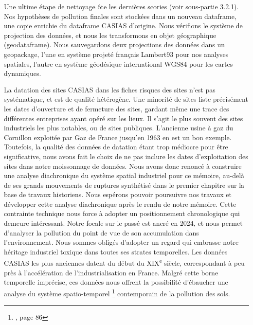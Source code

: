 \documentclass[a4paper,twoside,12pt]{book}
\newcommand{\siecle}[1]{\textsc{#1}\textsuperscript{e} siècle}
\begin{document}
Une ultime étape de nettoyage ôte les dernières scories (voir sous-partie 3.2.1). Nos hypothèses de pollution finales sont stockées dans un nouveau dataframe, une copie enrichie du dataframe CASIAS d'origine. Nous vérifions le système de projection des données, et nous les transformons en objet géographique (geodataframe). Nous sauvegardons deux projections des données dans un geopackage, l'une en système projeté français Lambert93 pour nos analyses spatiales, l'autre en système géodésique international WGS84 pour les cartes dynamiques.  


La datation des sites CASIAS dans les fiches risques des sites n'est pas systématique, et est de qualité hétérogène. Une minorité de sites liste précisément les dates d'ouverture et de fermeture des sites, gardant même une trace des différentes entreprises ayant opéré sur les lieux. Il s'agit le plus souvent des sites industriels les plus notables, ou de sites publiques. L'ancienne usine à gaz du Cornillon exploitée par Gaz de France jusqu'en 1963 en est un bon exemple. Toutefois, la qualité des données de datation étant trop médiocre pour être significative, nous avons fait le choix de ne pas inclure les dates d'exploitation des sites dans notre moissonnage de données. Nous avons donc renoncé à construire une analyse diachronique du système spatial industriel pour ce mémoire, au-delà de ses grands mouvements de ruptures synthétisé dans le premier chapitre sur la base de travaux historiens. Nous espérons pouvoir poursuivre nos travaux et développer cette analyse diachronique après le rendu de notre mémoire. Cette contrainte technique nous force à adopter un positionnement chronologique qui demeure intéressant. Notre focale sur le passé est ancré en 2024, et nous permet d'analyser la pollution du point de vue de son accumulation dans l'environnement. Nous sommes obligés d'adopter un regard qui embrasse notre héritage industriel toxique dans toutes ses strates temporelles. Les données CASIAS les plus anciennes datent du début du \siecle{XIX}, correspondant à peu près à l'accélération de l'industrialisation en France. Malgré cette borne temporelle imprécise, ces données nous offrent la possibilité d'ébaucher   une analyse du système spatio-temporel \footnote{\cite{grataloup_christian_introduction_2023}, page 86} contemporain de la pollution des sols. 
\end{document}
